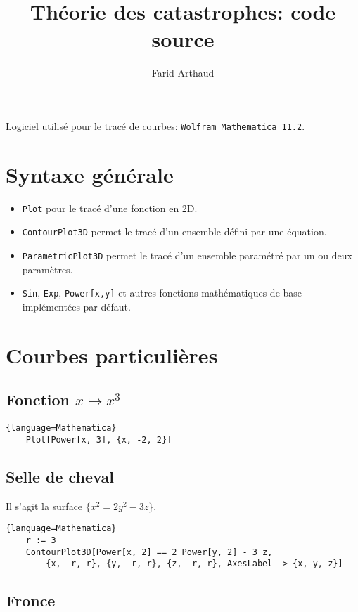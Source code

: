 \documentclass[a4paper]{article}
\author{Farid Arthaud}
\title{Théorie des catastrophes: code source}
\date{}
\begin{document}
\maketitle

Logiciel utilisé pour le tracé de courbes: \texttt{Wolfram Mathematica 11.2}.

\section{Syntaxe générale}

\begin{itemize}
    \item \texttt{Plot} pour le tracé d'une fonction en 2D.
    \item \texttt{ContourPlot3D} permet le tracé d'un ensemble défini par une équation.
    \item \texttt{ParametricPlot3D} permet le tracé d'un ensemble paramétré par un ou deux paramètres.
    \item \texttt{Sin}, \texttt{Exp}, \texttt{Power[x,y]} et autres fonctions mathématiques de base implémentées par défaut.
\end{itemize}

\section{Courbes particulières}

\subsection{Fonction $x\mapsto x^3$}

\begin{lstlisting}{language=Mathematica}
    Plot[Power[x, 3], {x, -2, 2}]
\end{lstlisting}

\subsection{Selle de cheval}

Il s'agit la surface $\{x^2=2y^2-3z\}$.

\begin{lstlisting}{language=Mathematica}
    r := 3
    ContourPlot3D[Power[x, 2] == 2 Power[y, 2] - 3 z,
        {x, -r, r}, {y, -r, r}, {z, -r, r}, AxesLabel -> {x, y, z}]
\end{lstlisting}

\subsection{Fronce}
\end{document}
